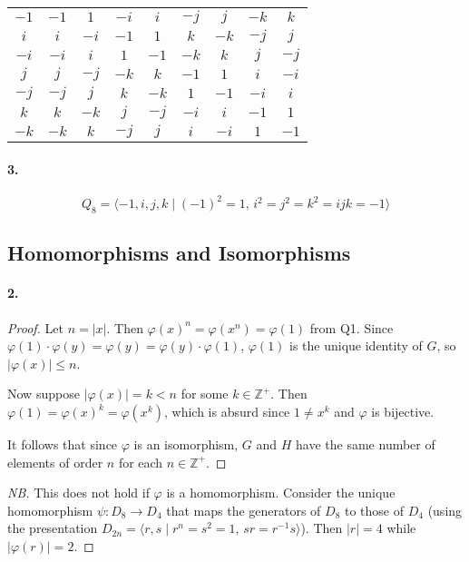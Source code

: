 \documentclass{article}
\begin{document}
\begin{enumerate}[(a)]
\begin{tabular}{c|cccccccc}
      $-1$ & $-1$ & $1$ & $-i$ & $i$ & $-j$ & $j$ & $-k$ & $k$ \\
      $i$ & $i$ & $-i$ & $-1$ & $1$ & $k$ & $-k$ & $-j$ & $j$ \\
      $-i$ & $-i$ & $i$ & $1$ & $-1$ & $-k$ & $k$ & $j$ & $-j$ \\
      $j$ & $j$ & $-j$ & $-k$ & $k$ & $-1$ & $1$ & $i$ & $-i$ \\
      $-j$ & $-j$ & $j$ & $k$ & $-k$ & $1$ & $-1$ & $-i$ & $i$ \\
      $k$ & $k$ & $-k$ & $j$ & $-j$ & $-i$ & $i$ & $-1$ & $1$ \\
      $-k$ & $-k$ & $k$ & $-j$ & $j$ & $i$ & $-i$ & $1$ & $-1$
    \end{tabular}
\end{enumerate}

\paragraph{3.} \[
  Q_8 = \langle -1, i, j, k \mid (-1)^2 = 1,\, i^2 = j^2 = k^2 = ijk = -1
  \rangle
\]

\subsection{Homomorphisms and Isomorphisms}

\paragraph{2.}
\begin{proof}
  Let $n = |x|$. Then $\varphi(x)^n = \varphi(x^n) = \varphi(1)$ from Q1. Since
  $\varphi(1) \cdot \varphi(y) = \varphi(y) = \varphi(y) \cdot \varphi(1)$,
  $\varphi(1)$ is the unique identity of $G$, so $|\varphi(x)| \leq n$.

  Now suppose $|\varphi(x)| = k < n$ for some $k \in \mathbb{Z}^+$. Then
  $\varphi(1) = \varphi(x)^k = \varphi(x^k)$, which is absurd since $1 \neq x^k$
  and $\varphi$ is bijective.

  It follows that since $\varphi$ is an isomorphism, $G$ and $H$ have the same
  number of elements of order $n$ for each $n \in \mathbb{Z}^+$.
\end{proof}
\begin{proof}[NB]
  This does not hold if $\varphi$ is a homomorphism. Consider the unique
  homomorphism $\psi: D_8 \to D_4$ that maps the generators of $D_8$ to those of
  $D_4$ (using the presentation $D_{2n} = \langle r, s \mid r^n = s^2 = 1,\,
  sr = r^{-1}s\rangle$). Then $|r| = 4$ while $|\varphi(r)| = 2$.
\end{proof}
\end{document}
